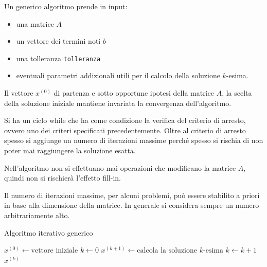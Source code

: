 Un generico algoritmo prende in input:
\begin{itemize}
    \item una matrice $A$
    \item un vettore dei termini noti $b$
    \item una tolleranza \texttt{tolleranza}
    \item eventuali parametri addizionali utili per il calcolo della soluzione
          $k$-esima.
\end{itemize}

Il vettore $x^{(0)}$ di partenza e sotto opportune ipotesi della matrice $A$, la
scelta della soluzione iniziale mantiene invariata la convergenza dell'algoritmo.

Si ha un ciclo while che ha come condizione la verifica del criterio di arresto,
ovvero uno dei criteri specificati precedentemente. Oltre al criterio di arresto
spesso si aggiunge un numero di iterazioni massime perché spesso si rischia di
non poter mai raggiungere la soluzione esatta.

Nell'algoritmo non si effettuano mai operazioni che modificano la matrice $A$,
quindi non si rischierà l'effetto fill-in.
\begin{nota}
    Il numero di iterazioni massime, per alcuni problemi, può essere stabilito
    a priori in base alla dimensione della matrice. In generale si considera
    sempre un numero arbitrariamente alto.
\end{nota}
\begin{algorithm}
    \caption{Algoritmo iterativo generico}
    \begin{algorithmic}
        \State $x^{(0)} \gets \text{vettore iniziale}$
        \State $k \gets 0$
        \State $x^{(k+1)} \gets \text{calcola la soluzione } k \text{-esima}$
        \State $k \gets k+1$
        \EndWhile
        \State \Return $x^{(k)}$
        \EndFunction
    \end{algorithmic}
\end{algorithm}
